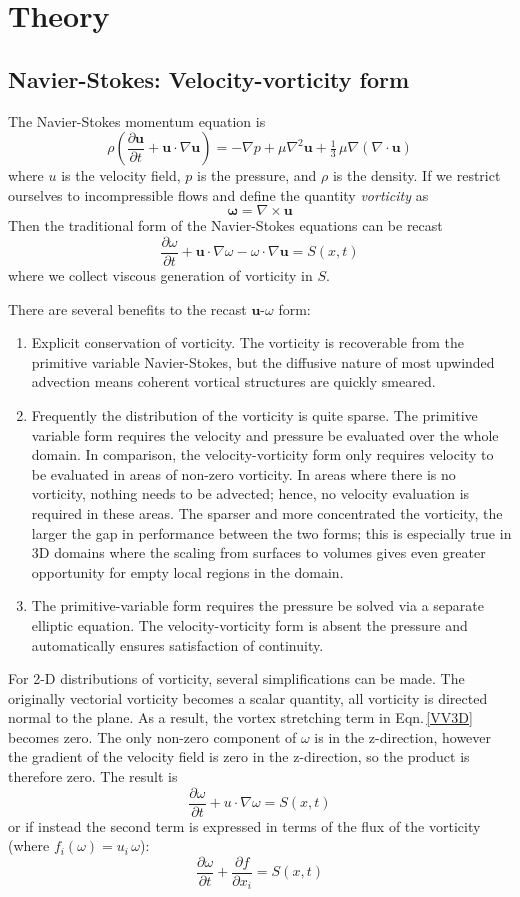 \documentclass[letterpaper,12pt]{report}
\newcommand{\be}{\begin{equation}}
\newcommand{\ben}[1]{\begin{equation}\label{#1}}
\newcommand{\ee}{\end{equation}}
\begin{document}
\chapter{Theory}
\section{Navier-Stokes: Velocity-vorticity form}
The Navier-Stokes momentum equation is
 \be \rho \left(\frac{\partial \mathbf{u}}{\partial t} + \mathbf{u} \cdot \nabla \mathbf{u} \right) = -\nabla p + \mu \nabla^2 \mathbf u + \tfrac13 \, \mu \nabla (\nabla\cdot\mathbf{u}) \ee
where $u$ is the velocity field, $p$ is the pressure, and $\rho$ is the density. If we restrict ourselves to incompressible flows and define the quantity \textit{vorticity} as
\be \mathbf{\omega} = \nabla \times \mathbf{u} \ee
Then the traditional form of the Navier-Stokes equations can be recast
\ben{VV3D} \frac{\partial \omega}{\partial t} +  \mathbf{u} \cdot \nabla \omega - \omega \cdot \nabla  \mathbf{u} = S(x,t)\ee
where we collect viscous generation of vorticity in $S$.

There are several benefits to the recast $\mathbf{u}$-$\omega$ form:
\begin{enumerate}
\item Explicit conservation of vorticity. The vorticity is recoverable from the primitive variable Navier-Stokes, but the diffusive nature of most upwinded advection means coherent vortical structures are quickly smeared.
\item Frequently the distribution of the vorticity is quite sparse. The primitive variable form requires the velocity and pressure be evaluated over the whole domain. In comparison, the velocity-vorticity form only requires velocity to be evaluated in areas of non-zero vorticity. In areas where there is no vorticity, nothing needs to be advected; hence, no velocity evaluation is required in these areas. The sparser and more concentrated the vorticity, the larger the gap in performance between the two forms; this is especially true in 3D domains where the scaling from surfaces to volumes gives even greater opportunity for empty local regions in the domain. 
\item The primitive-variable form requires the pressure be  solved via a separate elliptic equation. The velocity-vorticity form is absent the pressure and automatically ensures satisfaction of continuity.
\end{enumerate}

For 2-D distributions of vorticity, several simplifications can be made. The originally vectorial vorticity becomes a scalar quantity, all vorticity is directed normal to the plane. As a result, the vortex stretching term in  Eqn.\,\eqref{VV3D} becomes zero. The only non-zero component of $\omega$ is in the z-direction, however the gradient of the velocity field is zero in the z-direction, so the product is therefore zero. The result is
\ben{VV2D} \frac{\partial \omega}{\partial t} + u \cdot \nabla \omega = S(x,t)\ee
or if instead the second term is expressed in terms of the flux of the vorticity (where $f_i(\omega)=u_i\,\omega$):
\ben{VV2DB} \frac{\partial \omega}{\partial t} + \frac{\partial f}{\partial x_i}= S(x,t)\ee
\end{document}
